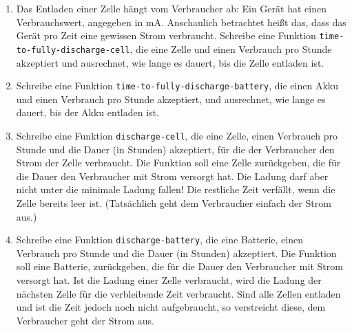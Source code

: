 \begin{aufgabe}
\begin{enumerate}
  \item Das Entladen einer Zelle hängt vom Verbraucher ab: Ein Gerät
    hat einen Verbrauchswert, angegeben in mA.  Anschaulich betrachtet
    heißt das, dass das Gerät pro Zeit eine gewissen Strom verbraucht.
    Schreibe eine Funktion \lstinline{time-to-fully-discharge-cell},
    die eine Zelle und einen Verbrauch pro Stunde akzeptiert und
    ausrechnet, wie lange es dauert, bis die Zelle entladen ist.

  \item Schreibe eine Funktion
    \lstinline{time-to-fully-discharge-battery}, die einen Akku und einen
    Verbrauch pro Stunde akzeptiert, und ausrechnet, wie lange es
    dauert, bis der Akku entladen ist.

  \item Schreibe eine Funktion \lstinline{discharge-cell}, die eine
    Zelle, einen Verbrauch pro Stunde und die Dauer (in Stunden)
    akzeptiert, für die der Verbraucher den Strom der Zelle
    verbraucht.  Die Funktion soll eine Zelle zurückgeben, die für die
    Dauer den Verbraucher mit Strom versorgt hat.  Die Ladung darf
    aber nicht unter die minimale Ladung fallen! Die restliche Zeit
    verfällt, wenn die Zelle bereits leer ist. (Tatsächlich geht dem
    Verbraucher einfach der Strom aus.)

  \item Schreibe eine Funktion \lstinline{discharge-battery}, die
    eine Batterie, einen Verbrauch pro Stunde und die Dauer (in
    Stunden) akzeptiert.  Die Funktion soll eine Batterie,
    zurückgeben, die für die Dauer den Verbraucher mit Strom versorgt
    hat.  Ist die Ladung einer Zelle verbraucht, wird die Ladung der
    nächsten Zelle für die verbleibende Zeit verbraucht.  Sind alle
    Zellen entladen und ist die Zeit jedoch noch nicht aufgebraucht,
    so verstreicht diese, dem Verbraucher geht der Strom aus.

  \end{enumerate}
  
\end{aufgabe}

